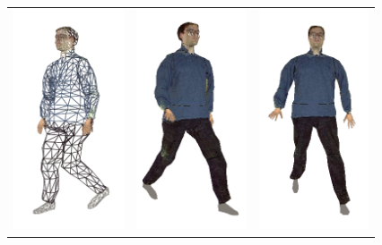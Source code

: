 \documentclass[10pt,oneside,fleqn,a4paper]{book}
\begin{document}
\begin{figure}
\begin{center}
\begin{tabular}{ccc}
\includegraphics[height=6.5cm]{../images/boris_wireframe} & \includegraphics[height=6.5cm]{../images/boris_1} & \includegraphics[height=6.5cm]{../images/boris_2} \\

\end{tabular}
\end{center}
\end{figure}
\end{document}

